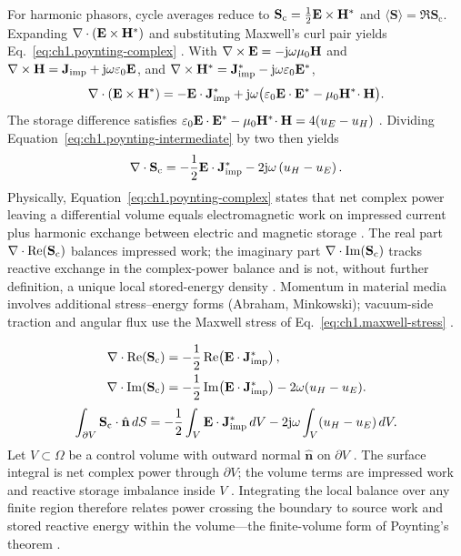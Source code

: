 For harmonic phasors, cycle averages reduce to $\mathbf{S}_\mathrm{c}=\tfrac12\mathbf{E}\times\mathbf{H}^*$ and $\langle\mathbf{S}\rangle=\Re\mathbf{S}_\mathrm{c}$. Expanding $\nabla\cdot(\mathbf{E}\times\mathbf{H}^*)$ and substituting Maxwell's curl pair yields Eq.~\eqref{eq:ch1.poynting-complex} \cite{stratton1941,harrington2001}.
With $\nabla\times\mathbf{E}=-\mathrm{j}\omega\mu_0\mathbf{H}$ and
$\nabla\times\mathbf{H}=\mathbf{J}_{\mathrm{imp}}+\mathrm{j}\omega\varepsilon_0\mathbf{E}$, and $\nabla\times\mathbf{H}^*=\mathbf{J}_{\mathrm{imp}}^*-\mathrm{j}\omega\varepsilon_0\mathbf{E}^*$,
\begin{equation}
\label{eq:ch1.poynting-intermediate}
\nabla\cdot(\mathbf{E}\times\mathbf{H}^*)
=-\mathbf{E}\cdot\mathbf{J}_{\mathrm{imp}}^*
+\mathrm{j}\omega\bigl(\varepsilon_0\mathbf{E}\cdot\mathbf{E}^*-\mu_0\mathbf{H}^*\!\cdot\mathbf{H}\bigr).
\end{equation}
The storage difference satisfies
$\varepsilon_0\mathbf{E}\cdot\mathbf{E}^*-\mu_0\mathbf{H}^*\!\cdot\mathbf{H}=4(u_E-u_H)$ \cite{stratton1941}.
Dividing Equation~\eqref{eq:ch1.poynting-intermediate} by two then yields
\begin{equation}
\label{eq:ch1.poynting-complex}
\nabla\cdot\mathbf{S}_\mathrm{c}
=-\frac{1}{2}\mathbf{E}\cdot\mathbf{J}_{\mathrm{imp}}^*
-2\mathrm{j}\omega\left(u_H-u_E\right).
\end{equation}
Physically, Equation~\eqref{eq:ch1.poynting-complex} states that net complex power leaving a differential volume equals electromagnetic work on impressed current plus harmonic exchange between electric and magnetic storage \cite{poynting1884}. The real part $\nabla\cdot\Re(\mathbf{S}_\mathrm{c})$ balances impressed work; the imaginary part $\nabla\cdot\Im(\mathbf{S}_\mathrm{c})$ tracks reactive exchange in the complex-power balance and is not, without further definition, a unique local stored-energy density \cite{stratton1941}. Momentum in material media involves additional stress--energy forms (Abraham, Minkowski); vacuum-side traction and angular flux use the Maxwell stress of Eq.~\eqref{eq:ch1.maxwell-stress} \cite{abraham1909,minkowski1908,stratton1941}.

\begin{equation}
\label{eq:ch1.poynting-real-imag-split}
\begin{aligned}
\nabla\cdot\Re(\mathbf{S}_\mathrm{c})&=-\frac12\Re\!\left(\mathbf{E}\cdot\mathbf{J}_{\mathrm{imp}}^*\right),\\
\nabla\cdot\Im(\mathbf{S}_\mathrm{c})&=-\frac12\Im\!\left(\mathbf{E}\cdot\mathbf{J}_{\mathrm{imp}}^*\right)-2\omega(u_H-u_E).
\end{aligned}
\end{equation}
\begin{equation}
\label{eq:ch1.power-balance-integral}
\int_{\partial V}\mathbf{S}_\mathrm{c}\cdot\hat{\mathbf{n}}\,dS
=-\frac12\int_V\mathbf{E}\cdot\mathbf{J}_{\mathrm{imp}}^*\,dV
-2\mathrm{j}\omega\int_V(u_H-u_E)\,dV.
\end{equation}
Let $V\subset\Omega$ be a control volume with outward normal $\hat{\mathbf{n}}$ on $\partial V$ \cite{stratton1941}. The surface integral is net complex power through $\partial V$; the volume terms are impressed work and reactive storage imbalance inside $V$ \cite{poynting1884}. Integrating the local balance over any finite region therefore relates power crossing the boundary to source work and stored reactive energy within the volume---the finite-volume form of Poynting's theorem \cite{stratton1941}.

